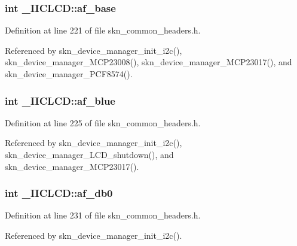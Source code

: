 \subsubsection[{af\+\_\+base}]{\setlength{\rightskip}{0pt plus 5cm}int \+\_\+\+I\+I\+C\+L\+C\+D\+::af\+\_\+base}\label{struct___i_i_c_l_c_d_ae74954b1b96523d617a68e42c2663086}


Definition at line 221 of file skn\+\_\+common\+\_\+headers.\+h.



Referenced by skn\+\_\+device\+\_\+manager\+\_\+init\+\_\+i2c(), skn\+\_\+device\+\_\+manager\+\_\+\+M\+C\+P23008(), skn\+\_\+device\+\_\+manager\+\_\+\+M\+C\+P23017(), and skn\+\_\+device\+\_\+manager\+\_\+\+P\+C\+F8574().

\hypertarget{struct___i_i_c_l_c_d_ad64bc4c5fc6a592f161e594f0b2433e1}{}
\subsubsection[{af\+\_\+blue}]{\setlength{\rightskip}{0pt plus 5cm}int \+\_\+\+I\+I\+C\+L\+C\+D\+::af\+\_\+blue}\label{struct___i_i_c_l_c_d_ad64bc4c5fc6a592f161e594f0b2433e1}


Definition at line 225 of file skn\+\_\+common\+\_\+headers.\+h.



Referenced by skn\+\_\+device\+\_\+manager\+\_\+init\+\_\+i2c(), skn\+\_\+device\+\_\+manager\+\_\+\+L\+C\+D\+\_\+shutdown(), and skn\+\_\+device\+\_\+manager\+\_\+\+M\+C\+P23017().

\hypertarget{struct___i_i_c_l_c_d_a86dfd51ffdc849569bc91bba9f9cd4a6}{}
\subsubsection[{af\+\_\+db0}]{\setlength{\rightskip}{0pt plus 5cm}int \+\_\+\+I\+I\+C\+L\+C\+D\+::af\+\_\+db0}\label{struct___i_i_c_l_c_d_a86dfd51ffdc849569bc91bba9f9cd4a6}


Definition at line 231 of file skn\+\_\+common\+\_\+headers.\+h.



Referenced by skn\+\_\+device\+\_\+manager\+\_\+init\+\_\+i2c().

